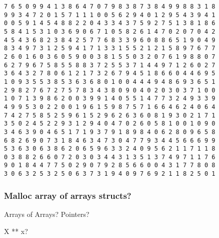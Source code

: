 \documentclass[11pt]{article}
\begin{document}
\begin{verbatim}
7 6 5 0 9 9 4 1 3 8 6 4 7 0 7 9 8 3 8 7 3 8 4 9 9 8 8 3 1 8 
9 9 3 4 7 2 0 1 5 7 1 1 1 0 0 5 6 2 9 4 0 1 2 9 5 4 3 9 4 1 
0 0 5 9 1 4 5 4 8 8 2 2 0 4 3 3 4 3 7 5 9 2 7 5 1 3 8 1 8 6 
5 8 4 1 5 3 1 0 3 6 9 0 6 7 1 0 5 8 2 6 1 4 7 0 2 0 7 0 4 2 
4 5 4 3 6 8 2 3 8 4 2 5 7 7 6 8 3 3 9 6 0 8 8 6 5 1 9 0 4 9 
8 3 4 9 7 3 1 2 5 9 4 1 7 1 3 3 1 5 5 2 1 2 1 5 8 9 7 6 7 7 
2 6 0 1 6 0 3 6 0 5 9 0 0 3 8 1 5 5 0 3 2 0 7 6 1 9 8 8 0 7 
6 2 7 9 6 7 5 8 5 5 8 8 3 7 2 5 5 3 7 1 4 4 9 7 1 2 6 0 2 7 
3 6 4 3 2 7 8 0 6 1 2 1 7 3 2 6 7 9 4 5 1 8 6 6 0 4 4 6 9 5 
1 0 9 3 5 5 3 8 5 3 6 3 6 8 0 1 0 0 4 4 4 9 4 8 6 9 3 6 5 1 
2 9 8 2 7 6 7 2 7 5 7 8 3 4 3 8 0 9 0 4 0 2 0 3 0 3 7 1 0 0 
1 0 7 1 3 9 8 6 2 0 0 3 9 9 1 4 0 5 5 1 4 7 7 3 2 4 9 3 3 9 
4 9 9 5 3 0 2 2 0 0 1 9 6 1 5 9 8 7 5 7 1 6 6 4 6 2 4 0 6 4 
7 4 2 7 5 8 5 2 5 9 6 1 5 2 9 6 2 6 3 6 0 8 1 9 3 0 2 1 7 1 
3 5 0 2 4 5 2 2 9 3 1 2 9 4 0 4 7 0 2 6 0 5 8 1 0 0 1 0 9 0 
3 4 6 3 9 0 4 6 5 1 7 1 9 3 7 9 1 8 9 8 4 0 6 2 8 0 9 6 5 8 
6 8 2 6 9 0 7 3 1 8 4 6 3 4 7 3 0 4 7 7 9 3 4 4 5 6 6 6 9 9 
5 3 6 3 0 6 3 8 6 2 0 6 5 9 6 3 3 2 4 0 9 5 6 2 1 1 7 1 1 8 
0 3 8 8 2 6 6 0 7 2 0 3 0 3 4 4 3 1 3 5 1 3 7 4 9 7 1 1 7 6 
9 0 1 8 4 4 7 7 5 0 2 9 0 7 9 2 8 5 6 6 0 0 4 3 1 7 7 8 0 8 
3 0 6 3 2 5 3 2 5 0 6 3 7 3 1 9 4 0 9 7 6 9 2 1 1 8 2 5 0 1
\end{verbatim}


\subsubsection{Malloc array of arrays structs?}
\label{sec:org0d25e29}

Arrays of Arrays? Pointers?

X ** x?
\end{document}
